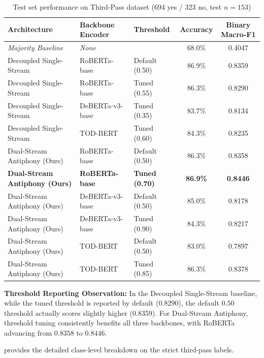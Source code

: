 \begin{table}[htbp]
  \centering
  \small
  \caption{Test set performance on Third-Pass dataset (694 yes / 323 no, test $n=153$)}
  \label{tab:results-part3}
  \begin{tabularx}{\textwidth}{ll>{\centering\arraybackslash}Xcc}
    \toprule
    \textbf{Architecture} & \textbf{Backbone Encoder} & \textbf{Threshold} & \textbf{Accuracy} & \textbf{Binary Macro-F1} \\
    \midrule
    \textit{Majority Baseline} & \textit{None} & 0.50 & 68.0\% & 0.4047 \\
    \midrule
    \rowcolor{lightbg}
    Decoupled Single-Stream & RoBERTa-base & Default (0.50) & 86.9\% & 0.8359 \\
    Decoupled Single-Stream & RoBERTa-base & Tuned (0.55) & 86.3\% & 0.8290 \\
    \rowcolor{lightbg}
    Decoupled Single-Stream & DeBERTa-v3-base & Tuned (0.35) & 83.7\% & 0.8134 \\
    Decoupled Single-Stream & TOD-BERT & Tuned (0.60) & 84.3\% & 0.8235 \\
    \midrule
    \rowcolor{lightbg}
    Dual-Stream Antiphony (Ours) & RoBERTa-base & Default (0.50) & 86.3\% & 0.8358 \\
    \textbf{Dual-Stream Antiphony (Ours)} & \textbf{RoBERTa-base} & \textbf{Tuned (0.70)} & \textbf{86.9\%} & \textbf{0.8446} \\
    \rowcolor{lightbg}
    Dual-Stream Antiphony (Ours) & DeBERTa-v3-base & Default (0.50) & 85.0\% & 0.8178 \\
    Dual-Stream Antiphony (Ours) & DeBERTa-v3-base & Tuned (0.90) & 84.3\% & 0.8217 \\
    \rowcolor{lightbg}
    Dual-Stream Antiphony (Ours) & TOD-BERT & Default (0.50) & 83.0\% & 0.7897 \\
    Dual-Stream Antiphony (Ours) & TOD-BERT & Tuned (0.85) & 86.3\% & 0.8378 \\
    \bottomrule
  \end{tabularx}
\end{table}

\textbf{Threshold Reporting Observation:} In the Decoupled Single-Stream baseline, while the tuned threshold is reported by default ($0.8290$), the default $0.50$ threshold actually scores slightly higher ($0.8359$). For Dual-Stream Antiphony, threshold tuning consistently benefits all three backbones, with RoBERTa advancing from $0.8358$ to $0.8446$.

 provides the detailed class-level breakdown on the strict third-pass labels.

